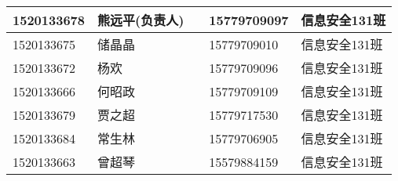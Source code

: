 \documentclass[12pt,a4paper]{article}
\begin{document}
\begin{CJK}{UTF8}{gbsn}
\begin{flushleft}
\begin{longtable}{|l|l|l|l|l|}
1520133678 & 熊远平(负责人) &            & 15779709097 & 信息安全131班 \\ \hline 
1520133675 & 储晶晶         &            & 15779709010 & 信息安全131班 \\ \hline
1520133672 & 杨欢           &            & 15779709096 & 信息安全131班 \\ \hline
1520133666 & 何昭政         &            & 15779709109 & 信息安全131班 \\ \hline
1520133679 & 贾之超         &            & 15779717530 & 信息安全131班 \\ \hline
1520133684 & 常生林         &            & 15779706905 & 信息安全131班 \\ \hline
1520133663 & 曾超琴         &            & 15579884159 & 信息安全131班 \\ \hline

\end{longtable}


\end{flushleft}

\end{CJK}
\end{document}
